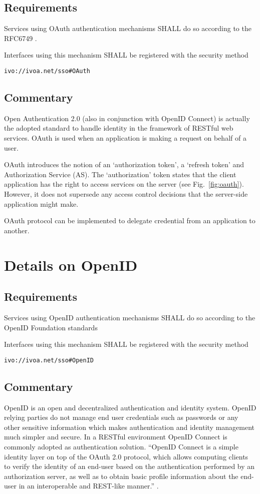 \documentclass[11pt,a4paper]{ivoa}
\begin{document}
\subsection{Requirements}
Services using OAuth authentication mechanisms SHALL do so according to the RFC6749 \citep{std:RFC6749}.

Interfaces using this mechanism SHALL  be registered with the security method 

\texttt{ivo://ivoa.net/sso\#OAuth}


\subsection{Commentary}
Open Authentication 2.0 (also in conjunction with OpenID Connect) is actually the adopted standard 
to handle identity in the framework of RESTful web services. 
OAuth is used when an application is making a request on behalf of a user.

OAuth introduces the notion of an `authorization token', a `refresh token' and Authorization Service (AS). 
The `authorization' token states that the client application has the right to access services on the server  (see Fig.~\ref{fig:oauth}). 
However, it does not supersede any access control decisions that the server-side application might make.

OAuth protocol can be implemented  to delegate credential from an application to another.

\section{Details on OpenID}
\subsection{Requirements}
Services using OpenID authentication mechanisms SHALL do so according to the OpenID Foundation standards \citep{std:openid}
  
Interfaces using this mechanism SHALL  be registered with the security method 

\texttt{ivo://ivoa.net/sso\#OpenID}

  
\subsection{Commentary}
OpenID is an open and decentralized authentication and identity system. OpenID relying parties do not manage end user credentials 
such as passwords or any other sensitive information which makes authentication and identity management much simpler and secure.
In a RESTful environment OpenID Connect \citep{std:openidconnect} is commonly adopted as authentication solution. ``OpenID Connect  is a simple identity 
layer on top of the OAuth 2.0 protocol, which allows computing clients to verify the identity of an end-user based on the authentication
 performed by an authorization server, as well as to obtain basic profile information about the end-user in an interoperable and REST-like manner.'' \citep{std:openid}.
  
\end{document}
